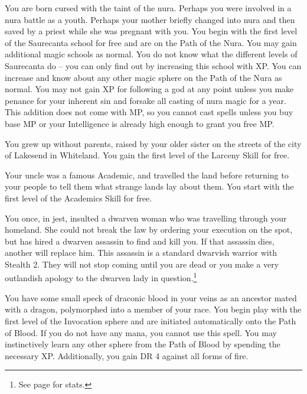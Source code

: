 \begin{list}{\addtocounter{list}{1}\textbf{:}}{\raggedleft}
\item{You are born cursed with the taint of the nura.  Perhaps you were involved in a nura battle as a youth.  Perhaps your mother briefly changed into nura and then saved by a priest while she was pregnant with you.  You begin with the first level of the Saurecanta school for free and are on the Path of the Nura.  You may gain additional magic schools as normal.  You do not know what the different levels of Saurecanta do -- you can only find out by increasing this school with XP.  You can increase and know about any other magic sphere on the Path of the Nura as normal.  You may not gain XP for following a god at any point unless you make penance for your inherent sin and forsake all casting of nura magic for a year.  This addition does not come with MP, so you cannot cast spells unless you buy base MP or your Intelligence is already high enough to grant you free MP.}

\item{You grew up without parents, raised by your older sister on the streets of the city of Lakesend in Whiteland.  You gain the first level of the Larceny Skill for free.}

\item{Your uncle was a famous Academic, and travelled the land before returning to your people to tell them what strange lands lay about them.  You start with the first level of the Academics Skill for free.}

\item{You once, in jest, insulted a dwarven woman who was travelling through your homeland.  She could not break the law by ordering your execution on the spot, but has hired a dwarven assassin to find and kill you.  If that assassin dies, another will replace him.  This assassin is a standard dwarvish warrior with Stealth 2.  They will not stop coming until you are dead or you make a very outlandish apology to the dwarven lady in question.\footnote{See page \pageref{dwarven_soldier} for stats.}}

\item{You have some small speck of draconic blood in your veins as an ancestor mated with a dragon, polymorphed into a member of your race.  You begin play with the first level of the Invocation sphere and are initiated automatically onto the Path of Blood.  If you do not have any mana, you cannot use this spell.  You may instinctively learn any other sphere from the Path of Blood by spending the necessary XP.  Additionally, you gain DR 4 against all forms of fire.}


\end{list}
